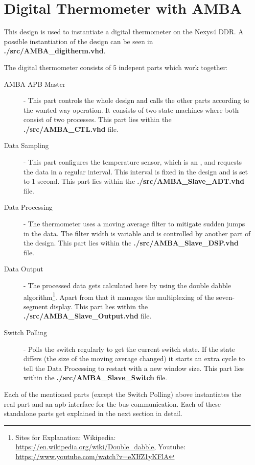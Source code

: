 \documentclass[%
	a4paper,
]
{article}
\begin{document}
\section{Digital Thermometer with AMBA}
\label{sec:characterization}

This design is used to instantiate a digital thermometer on the Nexys4 DDR.
A possible instantiation of the design can be seen in \textbf{./src/AMBA_digitherm.vhd}.


The digital thermometer consists of 5 indepent parts which work together:
\begin{description}
\item[AMBA APB Master] - This part controls the whole design and calls 
the other parts according to the wanted way operation. It consists of 
two state machines where both consist of two processes. This part lies within
the \mbox{\textbf{./src/AMBA_CTL.vhd}} file.
\item[Data Sampling] - This part configures the temperature sensor, which 
is an \autocite{ADT7420}, and requests the data in a regular interval. This interval 
is fixed in the design and is set to 1 second. This part lies within the 
\mbox{\textbf{./src/AMBA_Slave_ADT.vhd}} file.
\item[Data Processing] - The thermometer uses a moving average filter
to mitigate sudden jumps in the data. The filter width is variable and
is controlled by another part of the design. This part lies within the 
\mbox{\textbf{./src/AMBA_Slave_DSP.vhd}} file.
\item[Data Output] - The processed data gets calculated here by using the 
double dabble algorithm\footnote{Sites for Explanation: Wikipedia: \url{https://en.wikipedia.org/wiki/Double_dabble}, Youtube: \url{https://www.youtube.com/watch?v=eXIfZ1yKFlA}}. Apart from that
it manages the multiplexing of the seven-segment display. This part lies 
within the \mbox{\textbf{./src/AMBA_Slave_Output.vhd}} file.
\item[Switch Polling] - Polls the switch regularly to get the current switch
state. If the state differs (the size of the moving average changed) it starts
an extra cycle to tell the Data Processing to restart with a new window size.
This part lies within the \mbox{\textbf{./src/AMBA_Slave_Switch}} file.
\end{description}

Each of the mentioned parts (except the Switch Polling) above instantiates the real part and an apb\autocite{apb}-interface
for the bus communication. Each of these standalone parts get explained in the next 
section in detail.
\end{document}
